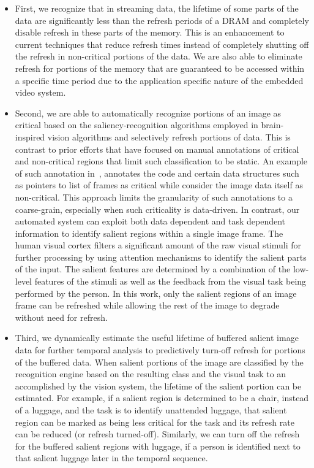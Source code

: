 \begin{itemize}
\item First, we recognize that in streaming data, the lifetime of some parts of the data are significantly less than the refresh periods of a DRAM and completely disable refresh in these parts of the memory. This is an enhancement to current techniques that reduce refresh times instead of completely shutting off the refresh in non-critical portions of the data. We are also able to eliminate refresh for portions of the memory that are guaranteed to be accessed within a specific time period due to the application specific nature of the embedded video system.
\item Second, we are able to automatically recognize portions of an image as critical based on the saliency-recognition algorithms employed in brain-inspired vision algorithms and selectively refresh portions of data. This is contrast to prior efforts that have focused on manual annotations of critical and non-critical regions that limit such classification to be static. An example of such annotation in~\cite{Liu2011}, annotates the code and certain data structures such as pointers to list of frames as critical while consider the image data itself as non-critical. This approach limits the granularity of such annotations to a coarse-grain, especially when such criticality is data-driven. In contrast, our automated system can exploit both data dependent and task dependent information to identify salient regions within a single image frame. 
The human visual cortex filters a significant amount of the raw visual stimuli for further processing by using attention mechanisms to identify the salient parts of the input. The salient features are determined by a combination of the low-level features of the stimuli as well as the feedback from the visual task being performed by the person. In this work, only the salient regions of an image frame can be refreshed while allowing the rest of the image to degrade without need for refresh. 
\item Third, we dynamically estimate the useful lifetime of buffered salient image data for further temporal analysis to predictively turn-off refresh for portions of the buffered data. When salient portions of the image are classified by the recognition engine based on the resulting class and the visual task to an accomplished by the vision system, the lifetime of the salient portion can be estimated. For example, if a salient region is determined to be a chair, instead of a luggage, and the task is to identify unattended luggage, that salient region can be marked as being less critical for the task and its refresh rate can be reduced (or refresh turned-off). Similarly, we can turn off the refresh for the buffered salient regions with luggage, if a person is identified next to that salient luggage later in the temporal sequence. 
\end{itemize}

